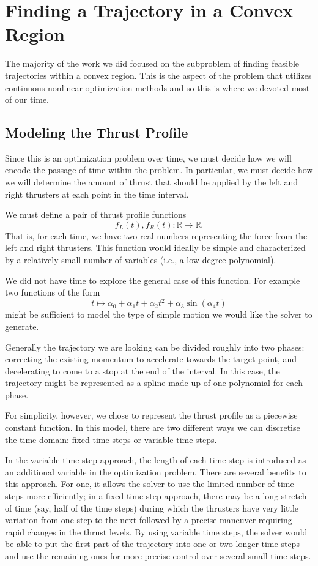 \documentclass{report}
\begin{document}

\chapter{Finding a Trajectory in a Convex Region}
The majority of the work we did focused on the subproblem of finding feasible
trajectories within a convex region. This is the aspect of the problem that utilizes
continuous nonlinear optimization methods and so this is where we devoted most
of our time.
\section{Modeling the Thrust Profile}
Since this is an optimization problem over time, we must decide how we will encode
the passage of time within the problem. In particular, we must decide how we will
determine the amount of thrust that should be applied by the left and right thrusters
at each point in the time interval.

We must define a pair of thrust profile functions
\[ f_L(t), f_R(t) : \mathbb{R} \to \mathbb{R}. \]
That is, for each time, we have two real numbers representing the force from the left and right
thrusters.
This function would ideally be simple and characterized by a relatively small number of variables (i.e.,
a low-degree polynomial).

We did not have time to explore the general case of this function. For example two functions of the form
\[ t \mapsto \alpha_0 + \alpha_1 t + \alpha_2 t^2 + \alpha_3 \sin(\alpha_4 t) \]
might be sufficient to model the type of simple motion we would like the solver to generate.

Generally the trajectory we are looking can be divided roughly into
two phases: correcting the existing momentum to accelerate towards the target point, and 
decelerating to come to a stop at the end of the interval. In this case, the trajectory
might be represented as a spline made up of one polynomial for each phase.

For simplicity, however, we chose to represent the thrust profile as a piecewise constant
function. In this model, there are two different ways we can discretise the time domain:
fixed time steps or variable time steps.

In the variable-time-step approach, the length of each time step is introduced as an additional
variable in the optimization problem. There are several benefits to this approach.
For one, it allows the solver to use the limited number of time steps more efficiently; in a
fixed-time-step approach, there may be a long stretch of time (say, half of the time steps)
during which the thrusters have very little variation from one step to the next followed by a
precise maneuver requiring rapid changes in the thrust levels. By using variable time steps,
the solver would be able to put the first part of the trajectory into one or two longer time steps
and use the remaining ones for more precise control over several small time steps.
\end{document}
